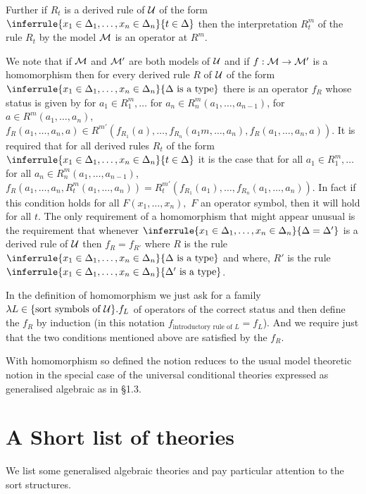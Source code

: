 Further if $R_t$ is a derived rule of $\mathcal{U}$ of the form $\inferrule{x_1\in\Delta_1,\ldots,x_n\in\Delta_n}{t\in\Delta}$ then the interpretation $R_t^m$ of the rule $R_t$ by the model $\mathcal{M}$ is an operator at $R^m$.

We note that if $\mathcal{M}$ and $\mathcal{M}'$ are both models of $\mathcal{U}$ and if $f:\mathcal{M}\to\mathcal{M}'$ is a homomorphism then for every derived rule $R$ of $\mathcal{U}$ of the form $\inferrule{x_1\in\Delta_1,\ldots,x_n\in\Delta_n}{\Delta\isatype}$ there is an operator $f_R$ whose status is given by for $a_1\in R_1^m,\ldots$ for $a_n\in R_n^m(a_1,\ldots,a_{n-1})$, for $a\in R^m(a_1,\ldots,a_n)$, $f_R(a_1,\ldots,a_n,a)\in R^{m'}(f_{R_1}(a),\ldots,f_{R_n}(a_1m,\ldots,a_n),f_R(a_1,\ldots,a_n,a))$.
%
It is required that for all derived rules $R_t$ of the form $\inferrule{x_1\in\Delta_1,\ldots,x_n\in\Delta_n}{t\in\Delta}$ it is the case that for all $a_1\in R_1^m,\ldots$ for all $a_n\in R_n^m(a_1,\ldots,a_{n-1})$, $f_R(a_1,\ldots,a_n,R_t^m(a_1,\ldots,a_n)) = R_t^{m'}(f_{R_1}(a_1),\ldots,f_{R_n}(a_1,\ldots,a_n)).$
%
In fact if this condition holds for all $F(x_1,\ldots,x_n),$ $F$ an operator symbol, then it will hold for all $t$.
%
The only requirement of a homomorphism that might appear unusual is the requirement that whenever $\inferrule{x_1\in\Delta_1,\ldots,x_n\in\Delta_n}{\Delta=\Delta'}$ is a derived rule of $\mathcal{U}$ then $f_R=f_{R'}$ where $R$ is the rule $\inferrule{x_1\in\Delta_1,\ldots,x_n\in\Delta_n}{\Delta\isatype}$ and where, $R'$ is the rule $\inferrule{x_1\in\Delta_1,\ldots,x_n\in\Delta_n}{\Delta'\isatype}$.

In the definition of homomorphism we just ask for a family $\lambda L\in\{\text{sort symbols of }\mathcal{U}\}.f_L$ of operators of the correct status and then define the $f_R$ by induction (in this notation $f_{\text{introductory rule of $L$}} = f_L$).
%
And we require just that the two conditions mentioned above are satisfied by the $f_R$.

With homomorphism so defined the notion reduces to the usual model theoretic notion in the special case of the universal conditional theories expressed as generalised algebraic as in \S 1.3.

\section{A Short list of theories} \label{sec:source-1-10}

We list some generalised algebraic theories and pay particular attention to the sort structures.

